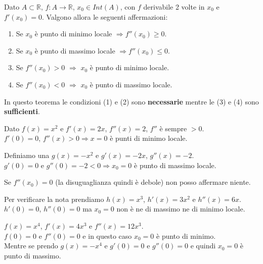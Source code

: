 \begin{theorem}
    Dato $A \subset \mathbb{R}$, $f: A \to \mathbb{R}$, $x_0 \in Int(A)$, con $f$ derivabile 2 volte in $x_0$ e $f'(x_0) = 0$. Valgono allora le seguenti affermazioni:
    \begin{enumerate}
        \item Se $x_0$ è punto di minimo locale $\Longrightarrow f''(x_0) \geq 0$.
        \item Se $x_0$ è punto di massimo locale $\Longrightarrow f''(x_0) \leq 0$.
        \item Se $f''(x_0) > 0$ $\Longrightarrow$ $x_0$ è punto di minimo locale.
        \item Se $f''(x_0) < 0$ $\Longrightarrow$ $x_0$ è punto di massimo locale.
    \end{enumerate}
\end{theorem}
\begin{note}
In questo teorema le condizioni (1) e (2) sono \textbf{necessarie} mentre le (3) e (4) sono \textbf{sufficienti}.
\end{note}

\begin{example}
Dato $f(x) = x^2$ e $f'(x) = 2x$, $f''(x) = 2$, $f''$ è sempre $> 0$.\\
$f'(0) = 0$, $f''(x) > 0 \Longrightarrow x = 0$ è punti di minimo locale.
\end{example}

\begin{example}
Definiamo una $g(x) = - x^2$ e $g'(x) = -2x$, $g''(x) = -2$.\\
$g'(0) = 0$ e $g''(0) = -2 < 0 \Longrightarrow x_0 = 0$ è punto di massimo locale.
\end{example}

\begin{note}
Se $f''(x_0) = 0$ (la disuguaglianza quindi è debole) non posso affermare niente.
\end{note}

\begin{example}
Per verificare la nota prendiamo $h(x) = x^3$, $h'(x) = 3x^2$ e $h''(x) = 6x$.\\
$h'(0) = 0$, $h''(0) = 0$ ma $x_0 = 0$ non è ne di massimo ne di minimo locale.
\end{example}

\begin{example}
$f(x) = x^4$, $f'(x) = 4x^3$ e $f''(x) = 12x^3$.\\
$f(0) = 0$ e $f''(0) = 0$ e in questo caso $x_0 = 0$ è punto di minimo.\\
Mentre se prendo $g(x) = -x^4$ e $g'(0) = 0$ e $g''(0) = 0$ e quindi $x_0 = 0$ è punto di massimo.
\end{example}

